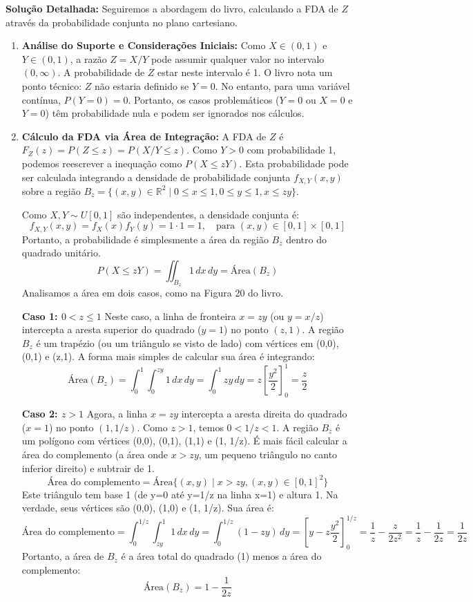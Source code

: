 \documentclass{article}
\begin{document}
	\textbf{Solução Detalhada:}
	Seguiremos a abordagem do livro, calculando a FDA de $Z$ através da probabilidade conjunta no plano cartesiano.
	
	\begin{enumerate}
		\item \textbf{Análise do Suporte e Considerações Iniciais:}
		Como $X \in (0, 1)$ e $Y \in (0, 1)$, a razão $Z=X/Y$ pode assumir qualquer valor no intervalo $(0, \infty)$. A probabilidade de $Z$ estar neste intervalo é 1.
		O livro nota um ponto técnico: $Z$ não estaria definido se $Y=0$. No entanto, para uma variável contínua, $P(Y=0) = 0$. Portanto, os casos problemáticos ($Y=0$ ou $X=0$ e $Y=0$) têm probabilidade nula e podem ser ignorados nos cálculos.
		
		\item \textbf{Cálculo da FDA via Área de Integração:}
		A FDA de $Z$ é $F_Z(z) = P(Z \le z) = P(X/Y \le z)$. Como $Y > 0$ com probabilidade 1, podemos reescrever a inequação como $P(X \le zY)$.
		Esta probabilidade pode ser calculada integrando a densidade de probabilidade conjunta $f_{X,Y}(x,y)$ sobre a região $B_z = \{(x,y) \in \mathbb{R}^2 \mid 0 \le x \le 1, 0 \le y \le 1, x \le zy\}$.
		
		Como $X, Y \sim U[0, 1]$ são independentes, a densidade conjunta é:
		\[
		f_{X,Y}(x,y) = f_X(x)f_Y(y) = 1 \cdot 1 = 1, \quad \text{para } (x,y) \in [0,1] \times [0,1]
		\]
		Portanto, a probabilidade é simplesmente a área da região $B_z$ dentro do quadrado unitário.
		\[
		P(X \le zY) = \iint_{B_z} 1 \,dx\,dy = \text{Área}(B_z)
		\]
		Analisamos a área em dois casos, como na Figura 20 do livro.
		
		\textbf{Caso 1: $0 < z \le 1$}
		Neste caso, a linha de fronteira $x=zy$ (ou $y=x/z$) intercepta a aresta superior do quadrado ($y=1$) no ponto $(z,1)$. A região $B_z$ é um trapézio (ou um triângulo se visto de lado) com vértices em (0,0), (0,1) e (z,1). A forma mais simples de calcular sua área é integrando:
		\[
		\text{Área}(B_z) = \int_0^1 \int_0^{zy} 1 \,dx\,dy = \int_0^1 zy \,dy = z \left[ \frac{y^2}{2} \right]_0^1 = \frac{z}{2}
		\]
		
		\textbf{Caso 2: $z > 1$}
		Agora, a linha $x=zy$ intercepta a aresta direita do quadrado ($x=1$) no ponto $(1, 1/z)$. Como $z > 1$, temos $0 < 1/z < 1$.
		A região $B_z$ é um polígono com vértices (0,0), (0,1), (1,1) e (1, 1/z). É mais fácil calcular a área do complemento (a área onde $x > zy$, um pequeno triângulo no canto inferior direito) e subtrair de 1.
		\[
		\text{Área do complemento} = \text{Área}\{(x,y) \mid x > zy, (x,y) \in [0,1]^2 \}
		\]
		Este triângulo tem base 1 (de y=0 até y=1/z na linha x=1) e altura 1. Na verdade, seus vértices são (0,0), (1,0) e (1, 1/z). Sua área é:
		\[
		\text{Área do complemento} = \int_0^{1/z} \int_{zy}^1 1 \,dx\,dy = \int_0^{1/z} (1-zy) \,dy = \left[ y - z\frac{y^2}{2} \right]_0^{1/z} = \frac{1}{z} - \frac{z}{2z^2} = \frac{1}{z} - \frac{1}{2z} = \frac{1}{2z}
		\]
		Portanto, a área de $B_z$ é a área total do quadrado (1) menos a área do complemento:
		\[
		\text{Área}(B_z) = 1 - \frac{1}{2z}
		\]
		

\end{enumerate}
\end{document}
